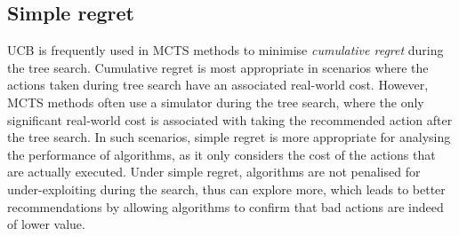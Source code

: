 \documentclass{article}
\newcommand{\todo}[1]{\hl{TODO: #1}}
\theoremstyle{plain}
\begin{document}
    \subsection{Simple regret}
    		UCB \cite{auer2002finite} is frequently used in MCTS methods to minimise \textit{cumulative regret} during the tree search. Cumulative regret is most appropriate in scenarios where the actions taken during tree search have an associated real-world cost. However, MCTS methods often use a simulator during the tree search, where the only significant real-world cost is associated with taking the recommended action after the tree search. In such scenarios, simple regret \cite{simple_regret_short,simple_regret_long} is more appropriate for analysing the performance of algorithms, as it only considers the cost of the actions that are actually executed. Under simple regret, algorithms are not penalised for under-exploiting during the search, thus can explore more, which leads to better recommendations by allowing algorithms to confirm that bad actions are indeed of lower value.
\end{document}
